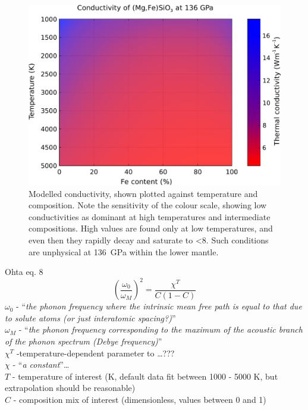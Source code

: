 \begin{figure}[h]
  \includegraphics[width=\linewidth]{Figures/K_over_T_over_X.png}
  \caption{Modelled conductivity, shown plotted against temperature and composition. Note the sensitivity of the colour scale, showing low conductivities as dominant at high temperatures and intermediate compositions. High values are found only at low temperatures, and even then they rapidly decay and saturate to <8\wmk. Such conditions are unphysical at 136~GPa within the lower mantle.}
  \label{fig:draft_ktc}
\end{figure}



Ohta eq. 8 
\begin{equation}%
\left ( \frac{\omega_{0}}{\omega_{M}} \right )^{2}=\frac{\chi^{T}}{C\left ( 1-C \right )}  
\label{eq.ohta8}
\end{equation}%
$\omega_{0}$ - \enquote{\textit{the phonon frequency where the intrinsic mean free path is equal to that due to solute atoms (or just interatomic spacing?)}}\\
$\omega_{M}$ - \enquote{\textit{the phonon frequency corresponding to the maximum of the acoustic branch of the phonon spectrum (Debye frequency)}}\\
$\chi^{T}$ -temperature-dependent parameter to \dots ??? \\
$\chi$ - \enquote{\textit{a constant}}\dots\\
$T$ - temperature of interest (K, default data fit between 1000 - 5000 K, but extrapolation should be reasonable)\\                    
$C$ - composition mix of interest (dimensionless, values between 0 and 1)\\

